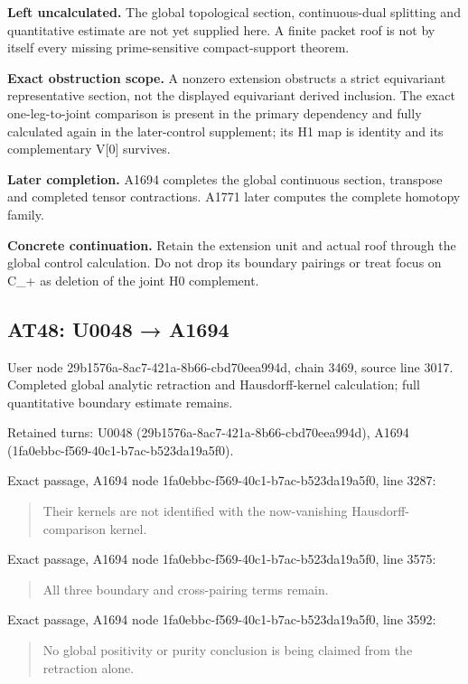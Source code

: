 \textbf{Left uncalculated.} The global topological section,
continuous-dual splitting and quantitative estimate are not yet supplied
here. A finite packet roof is not by itself every missing
prime-sensitive compact-support theorem.

\textbf{Exact obstruction scope.} A nonzero extension obstructs a strict
equivariant representative section, not the displayed equivariant
derived inclusion. The exact one-leg-to-joint comparison is present in
the primary dependency and fully calculated again in the later-control
supplement; its H1 map is identity and its complementary V{[}0{]}
survives.

\textbf{Later completion.} A1694 completes the global continuous
section, transpose and completed tensor contractions. A1771 later
computes the complete homotopy family.

\textbf{Concrete continuation.} Retain the extension unit and actual
roof through the global control calculation. Do not drop its boundary
pairings or treat focus on C\_+ as deletion of the joint H0 complement.

\subsection{AT48: U0048 → A1694}\label{at48-u0048-a1694}

User node 29b1576a-8ac7-421a-8b66-cbd70eea994d, chain 3469, source line
3017. Completed global analytic retraction and Hausdorff-kernel
calculation; full quantitative boundary estimate remains.

Retained turns: U0048 (29b1576a-8ac7-421a-8b66-cbd70eea994d), A1694
(1fa0ebbc-f569-40c1-b7ac-b523da19a5f0).

Exact passage, A1694 node 1fa0ebbc-f569-40c1-b7ac-b523da19a5f0, line
3287:

\begin{quote}
Their kernels are not identified with the now-vanishing
Hausdorff-comparison kernel.
\end{quote}

Exact passage, A1694 node 1fa0ebbc-f569-40c1-b7ac-b523da19a5f0, line
3575:

\begin{quote}
All three boundary and cross-pairing terms remain.
\end{quote}

Exact passage, A1694 node 1fa0ebbc-f569-40c1-b7ac-b523da19a5f0, line
3592:

\begin{quote}
No global positivity or purity conclusion is being claimed from the
retraction alone.
\end{quote}

